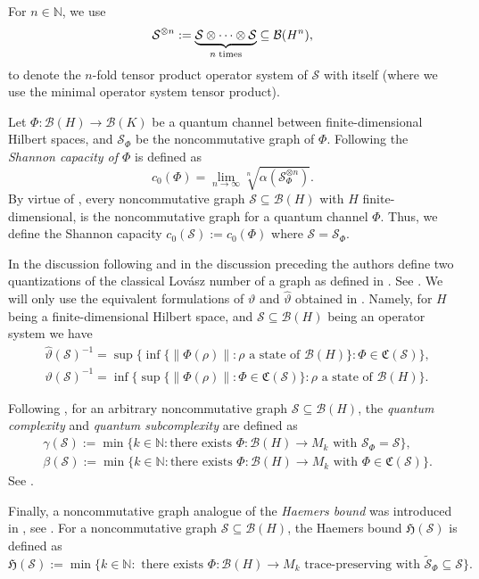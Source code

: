 \documentclass[11pt]{amsart}
\numberwithin{equation}{section}
\theoremstyle{plain}
\theoremstyle{definition}
\theoremstyle{remark}
\newcommand{\B}{{\mathcal{B}}}
\renewcommand{\S}{{\mathcal{S}}}
\def\ga{\gamma}
\newcommand{\bN}{\mathbb{N}}
\newcommand{\fC}{{\mathfrak{C}}}
\newcommand{\fH}{{\mathfrak{H}}}
\newcommand{\wt}{\widetilde}
\newcommand{\wh}{\widehat}
\begin{document}
For $n \in \bN$, we use 
\[
\S^{\otimes n} := \underbrace{\S\otimes \cdots \otimes \S}_{n \; {\rm times}} \subseteq \B(H^{n}),
\]
to denote the $n$-fold tensor product operator system of $\S$ with itself (where we use the minimal operator system tensor product). 

Let $\Phi\colon \B(H)\rightarrow \B(K)$ be a quantum channel between finite-dimensional Hilbert spaces, and $\S_{\Phi}$ be the noncommutative graph of $\Phi$. Following \cite{DSW13} the \textit{Shannon capacity of $\Phi$} is defined as
\[
c_{0}(\Phi) = \lim\limits_{n\rightarrow \infty}\sqrt[n]{\alpha(\S_{\Phi}^{\otimes n})}.
\]
By virtue of \cite[Lemma 2]{DUAN09}, every noncommutative graph $\S\subseteq \B(H)$ with $H$ finite-dimensional, is the noncommutative graph for a quantum channel $\Phi$. Thus, we define the Shannon capacity $c_{0}(\S):=c_{0}(\Phi)$ where $\S=\S_\Phi$.

In the discussion following \cite[Lemma 4.1]{BTW21} and in the discussion preceding \cite[Theorem 5.1]{BTW21} the authors define two quantizations of the classical Lov\'asz number of a graph as defined in \cite{Lov79}. See \cite[Corollary 4.6 and Proposition 5.3]{BTW21}.
We will only use the equivalent formulations of $\vartheta$ and $\wh{\vartheta}$ obtained in \cite[Theorem 5.1]{BTW21}.
Namely, for $H$ being a finite-dimensional Hilbert space, and $\S \subseteq \B(H)$ being an operator system we have
\begin{align*}
&\wh{\vartheta}(\S)^{-1} = \sup\{\inf\{\|\Phi(\rho)\|:\rho  \text { a state of } \B(H) \}:  \Phi \in \fC(\S)\},\\
&\vartheta(\S)^{-1} = \inf\{\sup\{\|\Phi(\rho)\|: \Phi \in \fC(\S)\}: \rho \text { a state of } \B(H) \}.
\end{align*}

Following \cite{LPT18}, for an arbitrary noncommutative graph $\S \subseteq \B(H)$, the \textit{quantum complexity} and \textit{quantum subcomplexity} are defined as
\begin{align*}
&\ga(\S) := \min\{k \in \bN: \text{there exists } \Phi\colon \B(H)\rightarrow M_{k} \text{ with } \S_{\Phi} = \S\},\\
&\beta(\S) := \min\{k \in \bN: \text{there exists } \Phi \colon \B(H)\rightarrow M_{k} \text{ with } \Phi \in \fC(\S)\}. 
\end{align*}
See \cite[Theorem IV.10]{LPT18}.

Finally, a noncommutative graph analogue of the \textit{Haemers bound} was introduced in \cite{GL20}, see \cite[Proposition 5]{GL20}. For a noncommutative graph $\S \subseteq \B(H)$, the Haemers bound $\mathfrak{H}(\S)$ is defined as
\[
\fH(\S) := \min\{k \in \mathbb{N}: \text{ there exists } \Phi\colon \B(H)\rightarrow M_{k} \text{ trace-preserving with } \wt{\S}_{\Phi} \subseteq \S\}. 
\]
\end{document}
